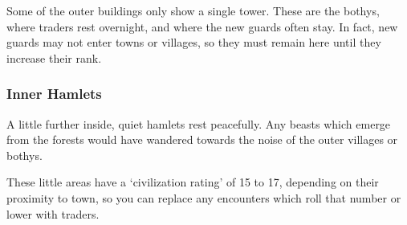 \begin{multicols}{2}
Some of the outer buildings only show a single tower.
These are the \glspl{bothy}, where traders rest overnight, and where the new \glspl{guard} often stay.
In fact, new \glspl{guard} may not enter towns or \glspl{village}, so they must remain here until they increase their rank.%

\subsubsection{Inner Hamlets}
A little further inside, quiet hamlets rest peacefully.
Any beasts which emerge from the forests would have wandered towards the noise of the outer \glspl{village} or \glspl{bothy}.

These little areas have a `civilization rating' of 15 to 17, depending on their proximity to town, so you can replace any encounters which roll that number or lower with traders.%

\end{multicols}


